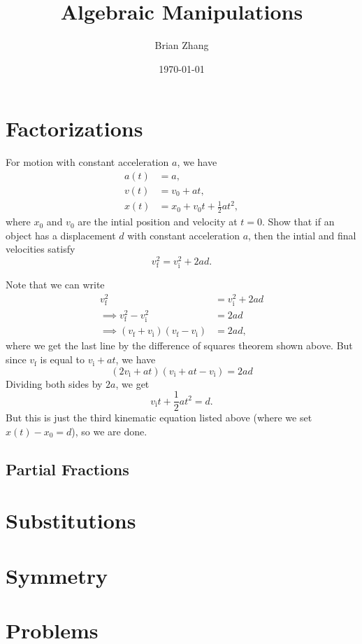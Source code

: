 \documentclass[11pt]{scrartcl}
\title{Algebraic Manipulations}
\author{Brian Zhang}
\date{\today}
\newcommand{\vii}{v_{\text{i}}}
\newcommand{\vff}{v_{\text{f}}}
\begin{document}
\maketitle

\section{Factorizations}
\begin{theorem}
\end{theorem}

\begin{example}
For motion with constant acceleration $a$, we have
\begin{align*}
a(t) &= a, \\
v(t) &= v_0 + at, \\
x(t) &= x_0 + v_0t + \frac12 at^2,
\end{align*}
where $x_0$ and $v_0$ are the intial position and velocity at $t=0$. Show that if an object has a displacement $d$ with constant acceleration $a$, then the intial and final velocities satisfy
\[\vff^2 = \vii^2 + 2ad.\]
\end{example}

\begin{soln}
Note that we can write
\begin{align*}
\vff^2 &= \vii^2 + 2ad \\ 
\implies \vff^2 - \vii^2 &= 2ad \\
\implies (\vff + \vii)(\vff - \vii) &= 2ad,
\end{align*}
where we get the last line by the difference of squares theorem shown above. But since $\vff$ is equal to $\vii + at$, we have
\[(2 \vii + at)(\vii + at - \vii)  = 2ad\]
Dividing both sides by $2a$, we get
\[\vii t + \frac12 at^2 = d. \]
But this is just the third kinematic equation listed above (where we set $x(t)-x_0=d$), so we are done. 
\end{soln}

\subsection{Partial Fractions}

\section{Substitutions}

\section{Symmetry}

\section{Problems}
\end{document}
